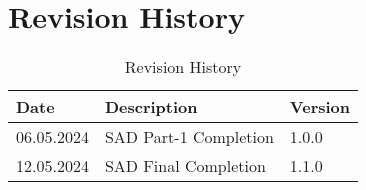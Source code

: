 \chapter*{Revision History}
 
\begin{table}[h] 
\centering
\begin{tabularx}{1\textwidth}{|X|X|X|}
\hline
Date & Description & Version  \\ \hline
06.05.2024 & SAD Part-1 Completion & 1.0.0   \\ \hline
12.05.2024 & SAD Final Completion & 1.1.0 \\ \hline
\end{tabularx}
\caption{Revision History \label{Tab:History}}

\end{table}
